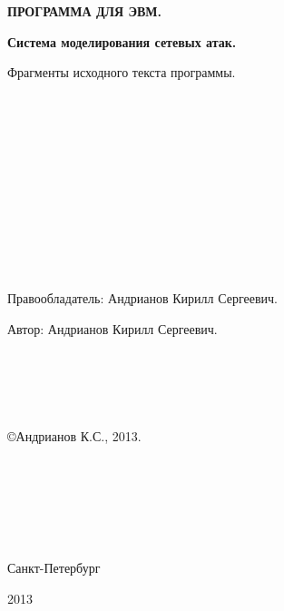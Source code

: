 
    \newpage
    \thispagestyle{empty}
    \ \\
    \ \\
    \ \\
    \ \\
    \ \\
    \ \\
    \ \\
    \ \\
    \ \\
    \ \\
    \ \\
    \ \\

    \begin{center}

        \textbf{ПРОГРАММА ДЛЯ ЭВМ.}

        \large\textbf{Система моделирования сетевых атак.}

        Фрагменты исходного текста программы.
    \end{center}

    \ \\
    \ \\
    \ \\
    \ \\
    \ \\
    \ \\
    \ \\
    \ \\
    \ \\
    \ \\
    \ \\


    Правообладатель: Андрианов Кирилл Сергеевич.

    Автор: Андрианов Кирилл Сергеевич.
    \ \\
    \ \\
    \ \\
    \ \\
    \ \\
    \ \\


    \copyright Андрианов К.С., 2013.


    \ \\
    \ \\
    \ \\
    \ \\
    \ \\

    \begin{center}
        Санкт-Петербург

        2013
    \end{center}

